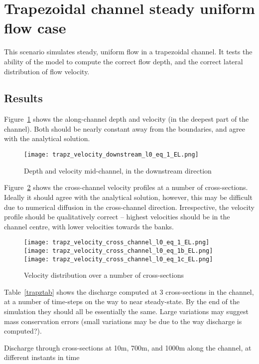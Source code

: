 \section{Trapezoidal channel steady uniform flow case}
This scenario simulates steady, uniform flow in a trapezoidal channel. It tests the ability of the model to compute the correct flow depth, and the correct lateral distribution of flow velocity.

\subsection{Results}
Figure~\ref{downstream_depth} shows the along-channel depth and velocity (in the deepest part of the channel). Both should be nearly constant away from the boundaries, and agree with the analytical solution. 

\begin{figure}[h]
\begin{center}
\texttt{[image: trapz\_velocity\_downstream\_l0\_eq\_1\_EL.png]}
\caption{Depth and velocity mid-channel, in the downstream direction}
\label{downstream_depth}
\end{center}
\end{figure}

Figure~\ref{xsect_vels} shows the cross-channel velocity profiles at a number of cross-sections. Ideally it should agree with the analytical solution, however, this may be difficult due to numerical diffusion in the cross-channel direction. Irrespective, the velocity profile should be qualitatively correct -- highest velocities should be in the channel centre, with lower velocities towards the banks.

\begin{figure}[h]
\begin{center}
\texttt{[image: trapz\_velocity\_cross\_channel\_l0\_eq\_1\_EL.png]}
\texttt{[image: trapz\_velocity\_cross\_channel\_l0\_eq\_1b\_EL.png]}
\texttt{[image: trapz\_velocity\_cross\_channel\_l0\_eq\_1c\_EL.png]}
\caption{Velocity distribution over a number of cross-sections}
\label{xsect_vels}
\end{center}
\end{figure}

Table~\ref{trapztab} shows the discharge computed at 3 cross-sections in the channel, at a number of time-steps on the way to near steady-state. By the end of the simulation they should all be essentially the same. Large variations may suggest mass conservation errors (small variations may be due to the way discharge is computed?).

\begin{table}
\caption{Discharge through cross-sections at 10m, 700m, and 1000m along the channel, at different instants in time}
\label{trapztab}
\end{table}

\endinput
